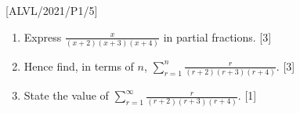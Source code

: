 \item {[}ALVL/2021/P1/5{]}
\begin{enumerate}
\item Express $\frac{x}{\left(x+2\right)\left(x+3\right)\left(x+4\right)}$
in partial fractions. \hfill{}{[}3{]}
\item Hence find, in terms of $n$, $\sum_{r=1}^{n}\frac{r}{\left(r+2\right)\left(r+3\right)\left(r+4\right)}$.
\hfill{}{[}3{]}
\item State the value of $\sum_{r=1}^{\infty}\frac{r}{\left(r+2\right)\left(r+3\right)\left(r+4\right)}$.
\hfill{}{[}1{]}
\end{enumerate}
